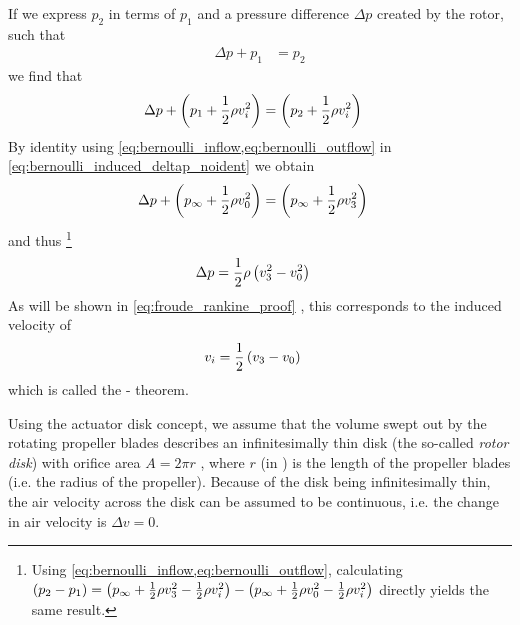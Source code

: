 If we express $p_2$ in terms of $p_1$ and a pressure difference $\Delta p$ created by the rotor, such that
\begin{align}
\Delta p + p_1 &= p_2
\end{align}
%
we find that
%
\begin{align}
\Delta p + \left( p_1 + \frac{1}{2} \rho v^2_i \right) &= \left(  p_2 + \frac{1}{2} \rho v^2_i \right) \label{eq:bernoulli_induced_deltap_noident}
\end{align}
%
By identity using \cref{eq:bernoulli_inflow,eq:bernoulli_outflow} in \cref{eq:bernoulli_induced_deltap_noident} we obtain
%
\begin{align}
\Delta p + \left( p_\infty + \frac{1}{2} \rho v^2_0 \right) &= \left( p_\infty + \frac{1}{2} \rho v^2_3 \right) \label{eq:bernoulli_induced_deltap}
\end{align}
%
and thus%
\footnote{Using \cref{eq:bernoulli_inflow,eq:bernoulli_outflow}, calculating
$\left( p_2 - p_1 \right) = \left(p_\infty + \frac{1}{2} \rho v^2_3 - \frac{1}{2} \rho v^2_i\right) - \left( p_\infty + \frac{1}{2} \rho v^2_0 - \frac{1}{2} \rho v^2_i\right)$ directly yields the same result.
}
%
\begin{align}
\Delta p &= \frac{1}{2} \rho \left( v^2_3 - v^2_0 \right) \label{eq:pressure_difference_v3}
\end{align}
%
As will be shown in \cref{eq:froude_rankine_proof} , this corresponds to the induced velocity of
%
\begin{align}
v_i &= \frac{1}{2} \left( v_3 - v_0 \right) \label{eq:froude_rankine_theorem}
\end{align}
%
which is called the - theorem.

Using the actuator disk concept, we assume that the volume swept out by the rotating propeller blades describes an infinitesimally thin disk (the so-called \textit{rotor disk}) with orifice area $A = 2\pi r$%
, where $r$ (in \withunit{\metre}) is the length of the propeller blades (i.e. the radius of the propeller).
Because of the disk being infinitesimally thin, the air velocity across the disk can be assumed to be continuous, i.e. the change in air velocity is $\Delta v = 0$. 

